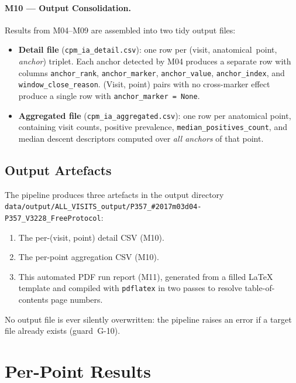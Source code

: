\documentclass[a4paper,11pt]{article}
\begin{document}
\paragraph{M10 --- Output Consolidation.}
Results from M04--M09 are assembled into two tidy output files:
\begin{itemize}
  \item \textbf{Detail file} (\texttt{cpm\_ia\_detail.csv}): one row per
        (visit, anatomical~point, \emph{anchor}) triplet. Each anchor detected by M04
        produces a separate row with columns \texttt{anchor\_rank},
        \texttt{anchor\_marker}, \texttt{anchor\_value}, \texttt{anchor\_index},
        and \texttt{window\_close\_reason}.
        (Visit, point) pairs with no cross-marker effect produce a single row with
        \texttt{anchor\_marker = None}.
  \item \textbf{Aggregated file} (\texttt{cpm\_ia\_aggregated.csv}): one row per
        anatomical point, containing visit counts, positive prevalence,
        \texttt{median\_positives\_count}, and median descent descriptors computed over
        \emph{all anchors} of that point.
\end{itemize}

\subsection{Output Artefacts}

The pipeline produces three artefacts in the output directory \texttt{data/output/ALL\_VISITS\_output/P357\_\#2017m03d04-P357\_V3228\_FreeProtocol}:
\begin{enumerate}
  \item The per-(visit, point) detail CSV (M10).
  \item The per-point aggregation CSV (M10).
  \item This automated PDF run report (M11), generated from a filled \LaTeX{} template
        and compiled with \texttt{pdflatex} in two passes to resolve table-of-contents
        page numbers.
\end{enumerate}
No output file is ever silently overwritten: the pipeline raises an error if a target
file already exists (guard~G-10).

\section{Per-Point Results}
\end{document}
